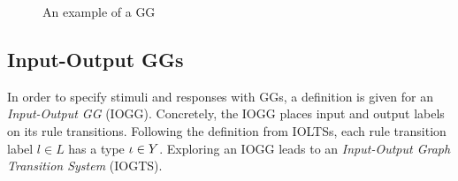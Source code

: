 \begin{figure}[ht]
  \begin{center}
    
  \end{center}
  \caption{An example of a GG}
  \label{fig:gg_example}
\end{figure}

\begin{comment}
\begin{figure}[ht]
  \begin{center}
    \subfloat[The initial graph]{\label{fig:gg_graph}}\hspace{20px}
    \subfloat[The LHS]{\label{fig:gg_lhs}}\hspace{20px}
    \subfloat[The first NAC]{\label{fig:gg_nac1}}
    
    \subfloat[The second NAC]{\label{fig:gg_nac2}}\hspace{20px}
    \subfloat[The RHS]{\label{fig:gg_rhs}}\hspace{20px}
    \subfloat[The result]{\label{fig:gg_result}}
  \end{center}
  \caption{An example of a GG}
  \label{fig:gts}
\end{figure}\marginpar{This picture needs to be placed in a structure, need a way of nesting graphs...}
\end{comment}

\subsection{Input-Output GGs}
In order to specify stimuli and responses with GGs, a definition is given for an \textit{Input-Output GG} (IOGG). Concretely, the IOGG places input and output labels on its rule transitions. Following the definition from IOLTSs, each rule transition label $l \in L$ has a type $\iota \in Y$. Exploring an IOGG leads to an \textit{Input-Output Graph Transition System} (IOGTS).
